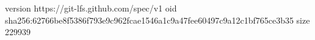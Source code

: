 version https://git-lfs.github.com/spec/v1
oid sha256:62766be8f5386f793e9c962fcae1546a1c9a47fee60497c9a12c1bf765ce3b35
size 229939
